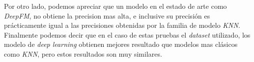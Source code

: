 \documentclass[11pt,a4paper,twoside]{thesis}
\begin{document}
Por otro lado, podemos apreciar que un modelo en el estado de arte como \textit{DeepFM}, no obtiene la precision mas alta, e inclusive su precisión es prácticamente igual a las precisiones obtenidas por la familia de modelo \textit{KNN}.
Finalmente podemos decir que en el caso de estas pruebas el \textit{dataset} utilizado, los modelo de \textit{deep learning} obtienen mejores resultado que modelos mas clásicos como \textit{KNN}, pero estos resultados son muy similares.


\backmatter
%
\end{document}
